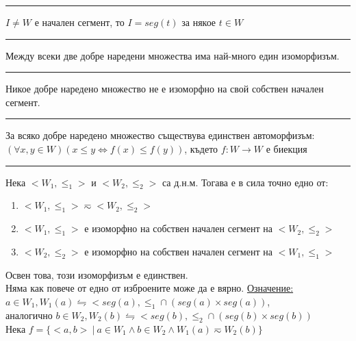 \documentclass[fleqn, titlepage, 12pt]{report}
\begin{document}
\bigbreak
\hrule
\bigbreak

$ I \neq W $ е начален сегмент, то $ I = seg(t) $ за някое $ t \in W $

\bigbreak
\hrule
\bigbreak

Между всеки две добре наредени множества има най-много един изоморфизъм.

\bigbreak
\hrule
\bigbreak

Никое добре наредено множество не е изоморфно на свой собствен начален сегмент.

\bigbreak
\hrule
\bigbreak

За всяко добре наредено множество съществува единствен автоморфизъм:\\
$ (\forall{x,y \in W})(x \leq y \Leftrightarrow f(x) \leq f(y)) $, където $ f : W \rightarrow W $ е биекция

\bigbreak
\hrule
\bigbreak

 Нека $ <W_1, \leq_1> $ и $ <W_2, \leq_2> $ са д.н.м. Тогава е в сила точно едно от:
\begin{enumerate}
  \item $ <W_1, \leq_1> \eqsim <W_2, \leq_2> $
  \item $ <W_1, \leq_1> $ е изоморфно на собствен начален сегмент на $ <W_2, \leq_2> $
  \item $ <W_2, \leq_2> $ е изоморфно на собствен начален сегмент на $ <W_1, \leq_1> $
\end{enumerate}
Освен това, този изоморфизъм е единствен.\\
Няма как повече от едно от изброените може да е вярно.
\bigbreak
\underline{Означение:} $ a \in W_1, W_1(a) \leftrightharpoons <seg(a), \leq_1 \cap (seg(a) \times seg(a)) $,\\
аналогично $ b \in W_2, W_2(b) \leftrightharpoons <seg(b), \leq_2 \cap (seg(b) \times seg(b)) $\\
Нека $ f = \{<a,b>\ |\ a \in W_1 \land b \in W_2 \land W_1(a) \eqsim W_2(b)\} $
\bigbreak
\end{document}
